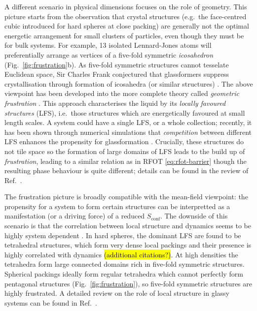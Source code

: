 \documentclass[11pt,twoside]{report}
\begin{document}
A different scenario in physical dimensions focuses on the role of geometry.
This picture starts from the observation that crystal structures (e.g.\ the face-centred cubic introduced for hard spheres at close packing) are generally not the optimal energetic arrangement for small clusters of particles, even though they must be for bulk systems.
For example, 13 isolated Lennard-Jones atoms will preferentially arrange as vertices of a five-fold symmetric \emph{icosahedron} \cite{FrankPRS1952} (Fig.\ \ref{fig:frustration}b).
As five-fold symmetric structures cannot tesselate Euclidean space, Sir Charles Frank conjectured that glassformers suppress crystallisation through formation of icosahedra (or similar structures) \cite{FrankPRS1952}.
The above viewpoint has been developed into the more complete theory called \emph{geometric frustration} \cite{KivelsonPA1995,TarjusJPCM2005}.
This approach characterises the liquid by its \emph{locally favoured structures} (LFS), i.e.\ those structures which are energetically favoured at small length scales.
A system could have a single LFS, or a whole collection; recently, it has been shown through numerical simulations that \emph{competition} between different LFS enhances the propensity for glassformation \cite{TeichNC2019}.
Crucially, these structures do not tile space so the formation of large domains of LFS leads to the build up of \emph{frustration}, leading to a similar relation as in RFOT \eqref{eq:rfot-barrier} though the resulting phase behaviour is quite different; details can be found in the review of Ref.\ \cite{TarjusJPCM2005}.

The frustration picture is broadly compatible with the mean-field viewpoint: the propensity for a system to form certain structures can be interpretted as a manifestation (or a driving force) of a reduced $S_\mathrm{conf}$.
The downside of this scenario is that the correlation between local structure and dynamics seems to be highly system dependent \cite{HockyPRL2014}.
In hard spheres, the dominant LFS are found to be tetrahedral structures, which form very dense local packings and their presence is highly correlated with dynamics \cite{HallettNC2018} \hl{(additional citations?)}.
At high densities the tetrahedra form large connected domains \cite{HallettNC2018} rich in five-fold symmetric structures.
Spherical packings ideally form regular tetrahedra which cannot perfectly form pentagonal structures (Fig.\ \ref{fig:frustration}), so five-fold symmetric structures are highly frustrated.
A detailed review on the role of local structure in glassy systems can be found in Ref.\ \cite{RoyallPR2015}.
\end{document}
